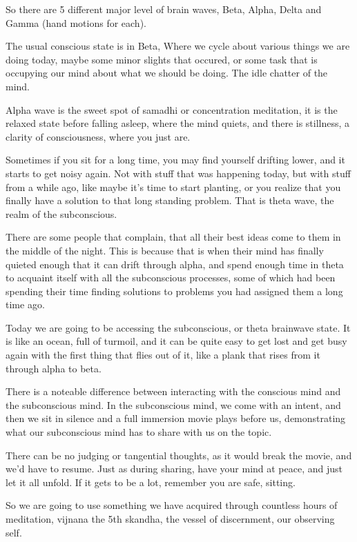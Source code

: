 So there are 5 different major level of brain waves,
Beta, Alpha, Delta and Gamma (hand motions for each).

The usual conscious state is in Beta, Where we cycle about various things we are
doing today, maybe some minor slights that occured, or some task that is
occupying our mind about what we should be doing. The idle chatter of the mind.

Alpha wave is the sweet spot of samadhi or concentration meditation, it is the
relaxed state before falling asleep, where the mind quiets, and there is
stillness, a clarity of consciousness, where you just are. 

Sometimes if you sit for a long time, you may find yourself drifting lower, and
it starts to get noisy again.  Not with stuff that was happening today, but with
stuff from a while ago, like maybe it's time to start planting, or you realize
that you finally have a solution to that long standing problem. That is theta
wave, the realm of the subconscious.

There are some people that complain, that all their best ideas come to them in
the middle of the night. This is because that is when their mind has finally
quieted enough that it can drift through alpha, and spend enough time in theta
to acquaint itself with all the subconscious processes, some of which had been
spending their time finding solutions to problems you had assigned them a long
time ago. 

Today we are going to be accessing the subconscious, or theta brainwave state.
It is like an ocean, full of turmoil, and it can be quite easy to get lost and
get busy again with the first thing that flies out of it, like a plank that
rises from it  through alpha to beta. 

There is a noteable difference between interacting with the conscious mind and
the subconscious mind.  In the subconscious mind, we come with an intent, and
then we sit in silence and a full immersion movie plays before us, demonstrating
what our subconscious mind has to share with us on the topic. 

There can be no judging or tangential thoughts, as it would break the movie, and
we'd have to resume.  Just as during sharing, have your mind at peace, and just
let it all unfold. If it gets to be a lot, remember you are safe, sitting. 

So we are going to use something we have acquired through countless hours of
meditation, vijnana the 5th skandha, the vessel of discernment, 
our observing self.  


